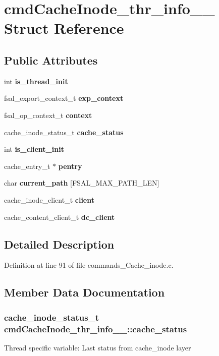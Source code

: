\section{cmdCacheInode\_\-thr\_\-info\_\-\_\- Struct Reference}
\label{structcmdCacheInode__thr__info____}
\subsection*{Public Attributes}
\begin{DoxyCompactItemize}
\item 
int {\bf is\_\-thread\_\-init}
\item 
fsal\_\-export\_\-context\_\-t {\bf exp\_\-context}
\item 
fsal\_\-op\_\-context\_\-t {\bf context}
\item 
cache\_\-inode\_\-status\_\-t {\bf cache\_\-status}
\item 
int {\bf is\_\-client\_\-init}
\item 
cache\_\-entry\_\-t $\ast$ {\bf pentry}
\item 
char {\bf current\_\-path} [FSAL\_\-MAX\_\-PATH\_\-LEN]
\item 
cache\_\-inode\_\-client\_\-t {\bf client}
\item 
cache\_\-content\_\-client\_\-t {\bf dc\_\-client}
\end{DoxyCompactItemize}


\subsection{Detailed Description}


Definition at line 91 of file commands\_\-Cache\_\-inode.c.

\subsection{Member Data Documentation}
\subsubsection[{cache\_\-status}]{\setlength{\rightskip}{0pt plus 5cm}cache\_\-inode\_\-status\_\-t {\bf cmdCacheInode\_\-thr\_\-info\_\-\_\-::cache\_\-status}}\label{structcmdCacheInode__thr__info_____ada0c4f4e3dd68e629dfb3675f814e4b7}
Thread specific variable: Last status from cache\_\-inode layer 

